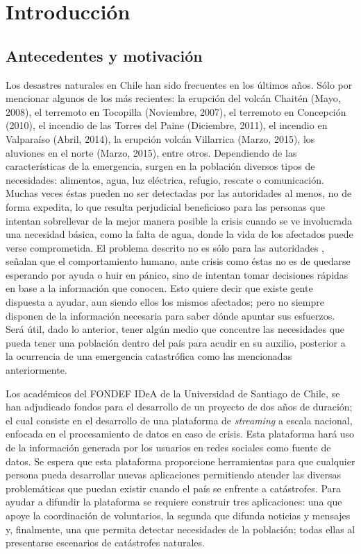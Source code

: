 \chapter{Introducción}
\label{cap:introduccion}

\section{Antecedentes y motivación}
\label{intro:motivacion}

Los desastres naturales en Chile han sido frecuentes en los últimos años. Sólo por mencionar algunos de los más recientes: la erupción del volcán Chaitén (Mayo, 2008), el terremoto en Tocopilla (Noviembre, 2007), el terremoto en Concepción (2010), el incendio de las Torres del Paine (Diciembre, 2011), el incendio en Valparaíso (Abril, 2014), la erupción volcán Villarrica (Marzo, 2015), los aluviones en el norte (Marzo, 2015), entre otros. Dependiendo de las características de la emergencia, surgen en la población diversos tipos de necesidades: alimentos, agua, luz eléctrica, refugio, rescate o comunicación. Muchas veces éstas pueden no ser detectadas por las autoridades al menos, no de forma expedita, lo que resulta perjudicial beneficioso para las personas que intentan sobrellevar de la mejor manera posible la crisis cuando se ve involucrada una necesidad básica, como la falta de agua, donde la vida de los afectados puede verse comprometida. El problema descrito no es sólo para las autoridades \cite{ChatoSurvey}, señalan que el comportamiento humano, ante crisis como éstas no es de quedarse esperando por ayuda o huir en pánico, sino de intentan tomar decisiones rápidas en base a la información que conocen. Esto quiere decir que existe gente dispuesta a ayudar, aun siendo ellos los mismos afectados; pero no siempre disponen de la información necesaria para saber dónde apuntar sus esfuerzos. Será útil, dado lo anterior, tener algún medio que concentre las necesidades que pueda tener una población dentro del país para acudir en su auxilio, posterior a la ocurrencia de una emergencia catastrófica como las mencionadas anteriormente.

Los académicos del FONDEF IDeA de la Universidad de Santiago de Chile, se han adjudicado fondos para el desarrollo de un proyecto de dos años de duración; el cual consiste en el desarrollo de una plataforma de \textit{streaming} a escala nacional, enfocada en el procesamiento de datos en caso de crisis. Esta plataforma hará uso de la información generada por los usuarios en redes sociales como fuente de datos. Se espera que esta plataforma proporcione herramientas para que cualquier persona pueda desarrollar nuevas aplicaciones permitiendo atender las diversas problemáticas que puedan existir cuando el país se enfrente a catástrofes. Para ayudar a difundir la plataforma se requiere construir tres aplicaciones: una que apoye la coordinación de voluntarios, la segunda que difunda noticias y mensajes y, finalmente, una que permita detectar necesidades de la población; todas ellas al presentarse escenarios de catástrofes naturales.

